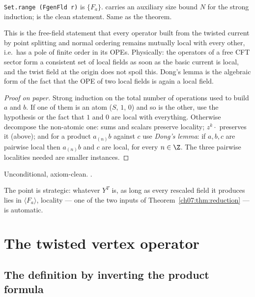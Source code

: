 \begin{dictionary}
\verb|Set.range (FgenFld r)| is $\{F_a\}$.  carries an auxiliary size bound
$N$ for the strong induction;  is the clean statement. Same as the theorem.
\end{dictionary}

\begin{physics}
This is the free-field statement that every operator built from the twisted current by point splitting and normal ordering remains mutually local with every other, i.e.\ has a pole of finite order in its OPEs. Physically: the operators of a free CFT sector form a consistent set of local fields as soon as the basic current is local, and the twist field at the origin does not spoil this. Dong's lemma is the algebraic form of the fact that the OPE of two local fields is again a local field.
\end{physics}

\begin{proof}[Proof on paper]
Strong induction on the total number of operations used to build $a$ and $b$. If one of them is
an atom ($S$, $1$, $0$) and so is the other, use the hypothesis or the fact that $1$ and $0$ are
local with everything. Otherwise decompose the non-atomic one: sums and scalars preserve locality;
$z^k\cdot$ preserves it (above); and for a product $a_{(n)}b$ against $c$ use \emph{Dong's lemma}:
if $a,b,c$ are pairwise local then $a_{(n)}b$ and $c$ are local, for every $n\in\Z$. The three
pairwise localities needed are smaller instances.
\end{proof}

\begin{status}
Unconditional, axiom-clean. .
\end{status}

The point is strategic: whatever $Y^T$ is, as long as every rescaled field it produces lies in
$\langle F_a\rangle$, locality --- one of the two inputs of Theorem~\ref{ch07:thm:reduction} ---
is automatic.

\section{The twisted vertex operator}\label{ch07:sec:vertex}

\subsection{The definition by inverting the product formula}\label{ch07:sec:Ywtdef}

